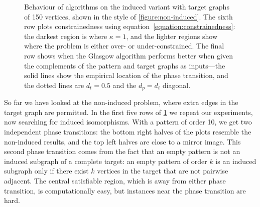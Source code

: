 \documentclass[twoside,11pt]{article}
\begin{document}
\begin{figure}[p]
    \caption{Behaviour of algorithms on the induced variant with target graphs of 150 vertices,
    shown in the style of \cref{figure:non-induced}. The sixth row plots constrainedness using
    equation~\eqref{equation:constrainedness}: the darkest region is where $\kappa = 1$, and the
    lighter regions show where the problem is either over- or under-constrained. The final row shows
    when the Glasgow algorithm performs better when given the complements of the pattern and target
    graphs as inputs---the solid lines show the empirical location of the phase transition, and the
    dotted lines are $d_t=0.5$ and the $d_p=d_t$ diagonal.}\label{figure:induced}
\end{figure}

So far we have looked at the non-induced problem, where extra edges in the target graph are
permitted.  In the first five rows of \cref{figure:induced} we repeat our experiments, now searching
for induced isomorphisms. With a pattern of order 10, we get two independent phase transitions: the
bottom right halves of the plots resemble the non-induced results, and the top left halves are close
to a mirror image. This second phase transition comes from the fact that an empty pattern is not an
induced subgraph of a complete target: an empty pattern of order $k$ is an induced subgraph only if
there exist $k$ vertices in the target that are not pairwise adjacent.  The central satisfiable
region, which is away from either phase transition, is computationally easy, but instances near the
phase transition are hard.
\end{document}
